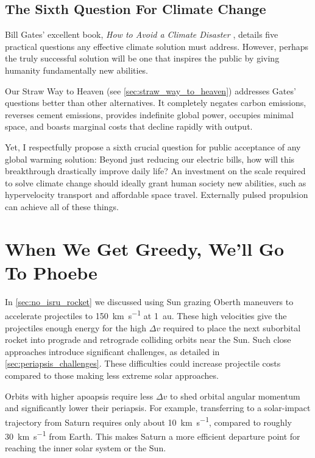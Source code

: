 \documentclass{article}
\begin{document}
\subsection{The Sixth Question For Climate Change}\label{sec:sith_question}
Bill Gates' excellent book, \textit{How to Avoid a Climate Disaster} \cite{gates2021avoid}, details five practical questions \cite{breakthroughenergy_2021_five} any effective climate solution must address. However, perhaps the truly successful solution will be one that inspires the public by giving humanity fundamentally new abilities.

Our Straw Way to Heaven (see \autoref{sec:straw_way_to_heaven}) addresses Gates' questions better than other alternatives. It completely negates carbon emissions, reverses cement emissions, provides indefinite global power, occupies minimal space, and boasts marginal costs that decline rapidly with output.

Yet, I respectfully propose a sixth crucial question for public acceptance of any global warming solution: Beyond just reducing our electric bills, how will this breakthrough drastically improve daily life? An investment on the scale required to solve climate change should ideally grant human society new abilities, such as hypervelocity transport and affordable space travel. Externally pulsed propulsion can achieve all of these things.  

\section{When We Get Greedy, We'll Go To Phoebe}\label{sec:greedy_phoebe}
In \autoref{sec:no_isru_rocket} we discussed using Sun grazing Oberth maneuvers to accelerate projectiles to \SI{150}{\kilo\meter\per\second} at \SI{1}{\astronomicalunit}. These high velocities give the projectiles enough energy for the high $\Delta v$ required to place the next suborbital rocket into  prograde and retrograde colliding orbits near the Sun. Such close approaches introduce significant challenges, as detailed in \autoref{sec:periapsis_challenges}. These difficulties could increase projectile costs compared to those making less extreme solar approaches.

Orbits with higher apoapsis require less $\Delta v$ to shed orbital angular momentum and significantly lower their periapsis. For example, transferring to a solar-impact trajectory from Saturn requires only about \SI{10}{\kilo\meter\per\second}, compared to roughly \SI{30}{\kilo\meter\per\second} from Earth. This makes Saturn a more efficient departure point for reaching the inner solar system or the Sun.
\end{document}
